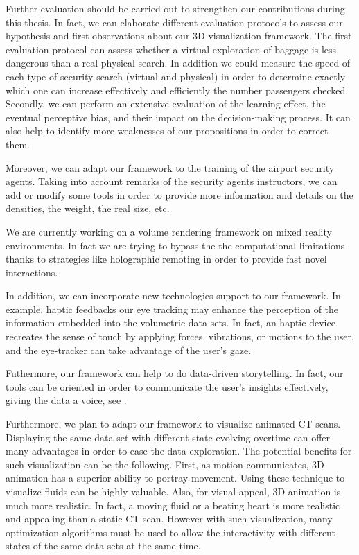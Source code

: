 Further evaluation should be carried out to strengthen our contributions during this thesis. In fact, we can elaborate different evaluation protocols to assess our hypothesis and first observations about our 3D visualization framework. The first evaluation protocol can assess whether a virtual exploration of baggage is less dangerous than a real physical search. In addition we could measure the speed of each type of security search (virtual and physical) in order to determine exactly which one can increase effectively and efficiently the number passengers checked. Secondly, we can perform an extensive evaluation  of the learning effect, the eventual perceptive bias, and their impact on the decision-making process.  It can also help to identify more weaknesses of our propositions in order to correct them. 

Moreover, we can adapt our framework to the training of the airport security agents. Taking into account remarks of the security agents instructors, we can add or modify some tools in order to provide more information and details on the densities, the weight, the real size, etc.  


We are currently working on a  volume rendering framework on mixed reality environments.  In fact we are trying to bypass the the computational limitations thanks to strategies like holographic remoting in order to provide fast novel interactions. 


In addition,  we can incorporate new technologies support to our framework. In example, haptic feedbacks our eye tracking may enhance the perception of the information embedded into the volumetric data-sets. In fact, an haptic device recreates the sense of touch by applying forces, vibrations, or motions to the user, and the eye-tracker can take advantage of the user's gaze. 


Futhermore, our framework can help to do data-driven storytelling. In fact, our tools can be oriented in order to communicate the user's insights effectively, giving the data a voice, see \cite{storytelling}.

Furthermore, we plan to adapt our framework to visualize animated CT scans. Displaying the same data-set with
 different state evolving overtime can offer many advantages in order to ease the data exploration. The potential
 benefits for such visualization can be the following. First, as motion communicates, 3D animation has a superior 
 ability to portray movement. Using these technique to visualize fluids can be highly valuable. Also, for visual
 appeal, 3D animation is much more realistic. In fact, a moving fluid or a beating heart is more realistic and
 appealing than a static CT scan. However with such visualization, many optimization algorithms must be used to
     allow the interactivity with different states of the same data-sets at the same time.
     

     